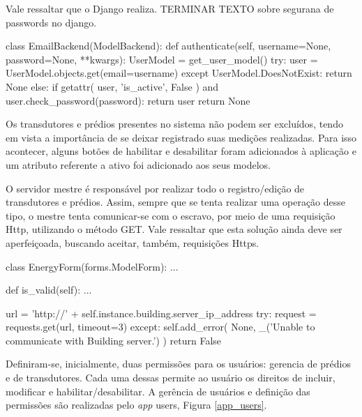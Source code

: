 Vale ressaltar que o Django realiza. TERMINAR TEXTO sobre segurana de passwords no django.

\begin{python}[caption={Corpo do método authenticate, classe EmailBackend.}, captionpos=b]
class EmailBackend(ModelBackend):
    def authenticate(self, username=None, password=None, **kwargs):
        UserModel = get_user_model()
        try:
            user = UserModel.objects.get(email=username)
        except UserModel.DoesNotExist:
            return None
        else:
            if getattr(
                user, 'is_active', False
            ) and user.check_password(password):
                return user
        return None
\end{python}

Os transdutores e prédios presentes no sistema não podem ser excluídos, tendo em vista a importância de se deixar registrado suas medições realizadas. Para isso acontecer, alguns botões de habilitar e desabilitar foram adicionados à aplicação e um atributo referente a ativo foi adicionado aos seus modelos.

O servidor mestre é responsável por realizar todo o registro/edição de transdutores e prédios. Assim, sempre que se tenta realizar uma operação desse tipo, o mestre tenta comunicar-se com o escravo, por meio de uma requisição Http, utilizando o método GET. Vale ressaltar que esta solução ainda deve ser aperfeiçoada, buscando aceitar, também, requisições Https.

\begin{python}[caption={Corpo do método is\_valid, classe EnergyForm.}, captionpos=b]
class EnergyForm(forms.ModelForm):
    ...

    def is_valid(self):
        ...

        url = 'http://' + self.instance.building.server_ip_address
        try:
            request = requests.get(url, timeout=3)
        except:
            self.add_error(
                None,
                _('Unable to communicate with Building server.')
            )
            return False
\end{python}

Definiram-se, inicialmente, duas permissões para os usuários: gerencia de prédios e de transdutores. Cada uma dessas permite ao usuário os direitos de incluir, modificar e habilitar/desabilitar. A gerência de usuários e definição das permissões são realizadas pelo \textit{app} users, Figura \ref{app_users}.

